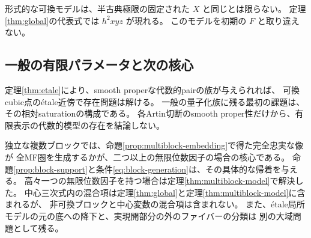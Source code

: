 形式的な可換モデルは、半古典極限の固定された \(X\) と同じとは限らない。
定理\ref{thm:global}の代表式では \(h^2xyz\) が現れる。
このモデルを初期の \(F\) と取り違えない。

\subsection{一般の有限パラメータと次の核心}

定理\ref{thm:etale}により、smooth properな代数的pairの族が与えられれば、
可換cubic点のétale近傍で存在問題は解ける。
一般の量子化族に残る最初の課題は、その相対saturationの構成である。
各Artin切断のsmooth proper性だけから、有限表示の代数的模型の存在を結論しない。

独立な複数ブロックでは、命題\ref{prop:multiblock-embedding}で得た完全忠実な像が
全MF圏を生成するかが、二つ以上の無限位数因子の場合の核心である。
命題\ref{prop:block-support}と条件\eqref{eq:block-generation}は、その具体的な帰着を与える。
高々一つの無限位数因子を持つ場合は定理\ref{thm:multiblock-model}で解決した。
中心三次式内の混合項は定理\ref{thm:global}と定理\ref{thm:multiblock-model}に含まれるが、
非可換ブロックと中心変数の混合項は含まれない。
また、étale局所モデルの元の底への降下と、実現開部分の外のファイバーの分類は
別の大域問題として残る。


